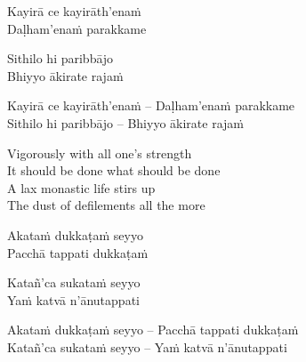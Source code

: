 \ifninebythirteen

\begin{pali-hang-verses}
  Kayirā ce kayirāth'enaṁ\\
  Daḷham'enaṁ parakkame
\end{pali-hang-verses}
\begin{pali-hang-together}
  Sithilo hi paribbājo\\
  Bhiyyo ākirate rajaṁ
\end{pali-hang-together}

\else

\begin{verses}
  Kayirā ce kayirāth'enaṁ – Daḷham'enaṁ parakkame\\
  Sithilo hi paribbājo – Bhiyyo ākirate rajaṁ
\end{verses}

\fi

\begin{english-verses}
  Vigorously with all one's strength\\
  It should be done what should be done\\
  A lax monastic life stirs up\\
  The dust of defilements all the more\ifdigital\makeatletter\hyperlink{endnote41-appendix}\makeatother\fi
\end{english-verses}

\ifninebythirteen\clearpage\fi

\ifninebythirteen

\begin{pali-hang-verses}
  Akataṁ dukkaṭaṁ seyyo\\
  Pacchā tappati dukkaṭaṁ
\end{pali-hang-verses}
\begin{pali-hang-together}
  Katañ'ca sukataṁ seyyo\\
  Yaṁ katvā n'ānutappati
\end{pali-hang-together}

\else

\begin{verses}
  Akataṁ dukkaṭaṁ seyyo – Pacchā tappati dukkaṭaṁ\\
  Katañ'ca sukataṁ seyyo – Yaṁ katvā n'ānutappati
\end{verses}


